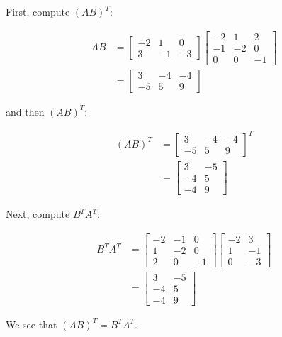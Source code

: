 \begin{solution}
    First, compute $(AB)^T$:

    \[
    \begin{aligned}
    A B &=\left[\begin{array}{rrr}
    -2 & 1 & 0 \\
    3 & -1 & -3
    \end{array}\right]\left[\begin{array}{rrr}
    -2 & 1 & 2 \\
    -1 & -2 & 0 \\
    0 & 0 & -1
    \end{array}\right] \\
    &=\left[\begin{array}{rrr}
        3 & -4 & -4 \\
        -5 & 5 & 9
        \end{array}\right]
    \end{aligned}
    \]

    and then $(AB)^T$:

    \[
    \begin{aligned}
    (A B)^{T} &=\left[\begin{array}{rrr}
        3 & -4 & -4 \\
        -5 & 5 & 9
        \end{array}\right]^{T} \\
    &=\left[\begin{array}{rr}
        3 & -5 \\
        -4 & 5 \\
        -4 & 9
        \end{array}\right]
    \end{aligned}
    \]

    Next, compute $B^T A^T$:

    \[
    \begin{aligned}
    B^{T} A^{T} &=\left[\begin{array}{rrr}
        -2 & -1 & 0 \\
        1 & -2 & 0 \\
        2 & 0 & -1
        \end{array}\right]\left[\begin{array}{rr}
        -2 & 3 \\
        1 & -1 \\
        0 & -3
        \end{array}\right] \\
    &=\left[\begin{array}{rr}
    3 & -5 \\
    -4 & 5 \\
    -4 & 9
    \end{array}\right]
    \end{aligned}
    \]

    We see that $(AB)^T = B^T A^T$. \end{solution}

